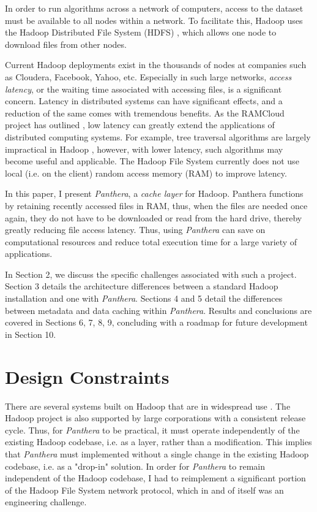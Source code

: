\documentclass[12pt]{article}
\begin{document}
In order to run algorithms across a network of computers, access to the dataset must be available to all nodes within a network. To facilitate this, Hadoop uses the Hadoop Distributed File System (HDFS) \cite{hdfs}, which allows one node to download files from other nodes. 

Current Hadoop deployments exist in the thousands of nodes at companies such as Cloudera, Facebook, Yahoo, etc. Especially in such large networks, \textit{access latency}, or the waiting time associated with accessing files, is a significant concern. Latency in distributed systems can have significant effects, and a reduction of the same comes with tremendous benefits. As the RAMCloud project has outlined \cite{ramcloud}, low latency can greatly extend the applications of distributed computing systems. For example, tree traversal algorithms are largely impractical in Hadoop \cite{ramcloud}, however, with lower latency, such algorithms may become useful and applicable. The Hadoop File System currently does not use local (i.e. on the client) random access memory (RAM) to improve latency.

In this paper, I present \textit{Panthera}, a \textit{cache layer} for Hadoop. Panthera functions by retaining recently accessed files in RAM, thus, when the files are needed once again, they do not have to be downloaded or read from the hard drive, thereby greatly reducing file access latency. Thus, using \textit{Panthera} can save on computational resources and reduce total execution time for a large variety of applications.

In Section 2, we discuss the specific challenges associated with such a project. Section 3 details the architecture differences between a standard Hadoop installation and one with \textit{Panthera}.  Sections 4 and 5 detail the differences between metadata and data caching within \textit{Panthera}. Results and conclusions are covered in Sections 6, 7, 8, 9, concluding with a roadmap for future development in Section 10.

\section{Design Constraints}

There are several systems built on Hadoop that are in widespread use \cite{hbase, cloudbatch, pig}. The Hadoop project is also supported by large corporations with a 
consistent release cycle. Thus, for \textit{Panthera} to be practical, it must operate independently of the existing Hadoop codebase, i.e. as a layer, rather than a modification. This implies that \textit{Panthera} must implemented without a single change in the existing Hadoop codebase, i.e. as a "drop-in" solution. In order for \textit{Panthera} to remain independent of the Hadoop codebase, I had to reimplement a significant portion of the Hadoop File System network protocol, which in and of itself was an engineering challenge.
\end{document}
